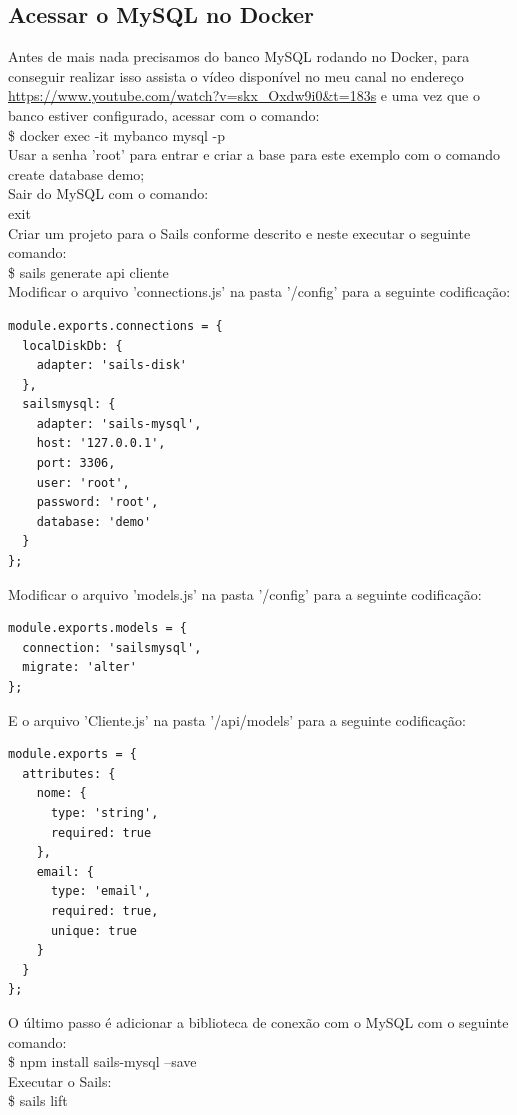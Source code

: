 \documentclass[a4paper,11pt]{article}
\begin{document}
\subsection{Acessar o MySQL no Docker}
Antes de mais nada precisamos do banco MySQL rodando no Docker, para conseguir realizar isso assista o vídeo disponível no meu canal no endereço \url{https://www.youtube.com/watch?v=skx_Oxdw9i0&t=183s} e uma vez que o banco estiver configurado, acessar com o comando: \\[1mm]
{\ttfamily\$ docker exec -it mybanco mysql -p} \\[3mm]
Usar a senha 'root' para entrar e criar a base para este exemplo com o comando \\[1mm]
{\ttfamily create database demo;} \\[3mm]
Sair do MySQL com o comando: \\[1mm]
{\ttfamily exit} \\[3mm]
Criar um projeto para o Sails conforme descrito e neste executar o seguinte comando: \\[1mm]
{\ttfamily\$ sails generate api cliente} \\[3mm]
Modificar o arquivo 'connections.js' na pasta '/config' para a seguinte codificação:
\begin{lstlisting}
module.exports.connections = {
  localDiskDb: {
    adapter: 'sails-disk'
  },
  sailsmysql: {
    adapter: 'sails-mysql',
    host: '127.0.0.1',
    port: 3306,
    user: 'root',
    password: 'root',
    database: 'demo'
  }
};
\end{lstlisting}
Modificar o arquivo 'models.js' na pasta '/config' para a seguinte codificação:
\begin{lstlisting}
module.exports.models = {
  connection: 'sailsmysql',
  migrate: 'alter'
};
\end{lstlisting}
E o arquivo 'Cliente.js' na pasta '/api/models' para a seguinte codificação:
\begin{lstlisting}
module.exports = {
  attributes: {
    nome: {
      type: 'string',
      required: true
    },
    email: {
      type: 'email',
      required: true,
      unique: true
    }
  }
};
\end{lstlisting}
O último passo é adicionar a biblioteca de conexão com o MySQL com o seguinte comando: \\[1mm]
{\ttfamily\$ npm install sails-mysql --save} \\[3mm]
Executar o Sails: \\[1mm]
{\ttfamily\$ sails lift} \\[3mm]
\end{document}
